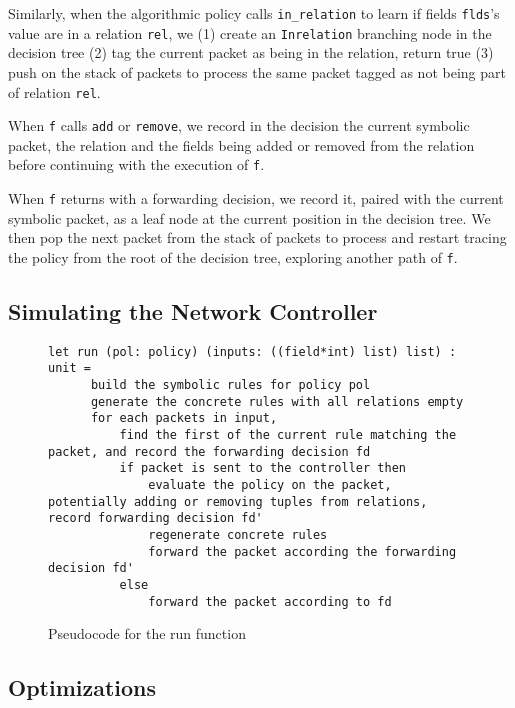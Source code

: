 \documentclass[11pt]{article}
\begin{document}
Similarly, when the algorithmic policy calls \lstinline|in_relation| to learn if fields \lstinline|flds|'s value are in a relation \lstinline|rel|, we (1) create an \lstinline|Inrelation| branching node in the decision tree (2) tag the current packet as being in the relation, return true (3) push on the stack of packets to process the same packet tagged as not being part of relation \lstinline|rel|.

When \lstinline|f| calls \lstinline|add| or \lstinline|remove|, we record in the decision the current symbolic packet, the relation and the fields being added or removed from the relation before continuing with the execution of \lstinline|f|.

When \lstinline|f| returns with a forwarding decision, we record it, paired with the current symbolic packet, as a leaf node at the current position in the decision tree. We then pop the next packet from the stack of packets to process and restart tracing the policy from the root of the decision tree, exploring another path of \lstinline|f|.  


\subsection*{Simulating the Network Controller}

\begin{figure}
\begin{lstlisting}
let run (pol: policy) (inputs: ((field*int) list) list) : unit =
      build the symbolic rules for policy pol
      generate the concrete rules with all relations empty
      for each packets in input,
          find the first of the current rule matching the packet, and record the forwarding decision fd
          if packet is sent to the controller then
              evaluate the policy on the packet, potentially adding or removing tuples from relations, record forwarding decision fd'
              regenerate concrete rules
              forward the packet according the forwarding decision fd'
          else
              forward the packet according to fd 
\end{lstlisting}

\caption{Pseudocode for the run function}
  \end{figure}



\subsection*{Optimizations}
\end{document}
